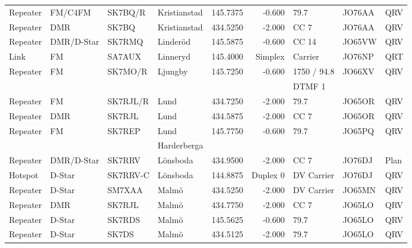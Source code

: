 \begin{landscape}
\begin{longtable}{llllrrlll}
Repeater & FM/C4FM         & SK7BQ/R  & Kristianstad & 145.7375     & -0.600     & 79.7         & JO76AA      & QRV      \\
Repeater & DMR             & SK7BQ    & Kristianstad & 434.5250     & -2.000     & CC 7         & JO76AA      & QRV      \\
Repeater & DMR/D-Star      & SK7RMQ   & Linderöd     & 145.5875     & -0.600     & CC 14        & JO65VW      & QRV      \\
Link     & FM              & SA7AUX   & Linneryd     & 145.4000     & Simplex    & Carrier      & JO76NP      & QRT      \\
Repeater & FM              & SK7MO/R  & Ljungby      & 145.7250     & -0.600     & 1750 / 94.8  & JO66XV      & QRV      \\
         &                 &          &              &              &            & DTMF 1       &             &          \\
Repeater & FM              & SK7RJL/R & Lund         & 434.7250     & -2.000     & 79.7         & JO65OR      & QRV      \\
Repeater & DMR             & SK7RJL   & Lund         & 434.5875     & -2.000     & CC 7         & JO65OR      & QRV      \\
Repeater & FM              & SK7REP   & Lund         & 145.7750     & -0.600     & 79.7         & JO65PQ      & QRV      \\
         &                 &          & Harderberga  &              &            &              &             &          \\
Repeater & DMR/D-Star      & SK7RRV   & Lönsboda     & 434.9500     & -2.000     & CC 7         & JO76DJ      & Plan     \\
Hotspot  & D-Star          & SK7RRV-C & Lönsboda     & 144.8875     & Duplex 0   & DV Carrier   & JO76DJ      & QRV      \\
Repeater & D-Star          & SM7XAA   & Malmö        & 434.5250     & -2.000     & DV Carrier   & JO65MN      & QRV      \\
Repeater & DMR             & SK7RJL   & Malmö        & 434.7750     & -2.000     & CC 7         & JO65LO      & QRV      \\
Repeater & D-Star          & SK7RDS   & Malmö        & 145.5625     & -0.600     & 79.7         & JO65LO      & QRV      \\
Repeater & D-Star          & SK7DS    & Malmö        & 434.5125     & -2.000     & 79.7         & JO65LO      & QRV      \\

\end{longtable}
\end{landscape}
